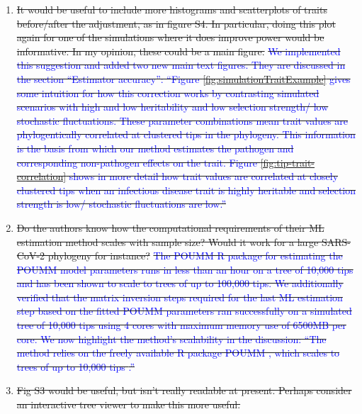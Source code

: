 \documentclass[12pt]{article} %
\providecommand{\DIFdel}[1]{{\protect\color{red}\sout{#1}}}                      %
\begin{document}
\begin{enumerate}
\item%
\DIFdel{It would be useful to include more histograms and scatterplots of traits before/after the adjustment, as in figure S4. In particular, doing this plot again for one of the simulations where it does improve power would be informative. In my opinion, these could be a main figure. }%
\DIFdel{\textcolor{blue}{We implemented this suggestion and added two new main text figures. They are discussed in the section ``Estimator accuracy'': ``Figure \ref{fig:simulationTraitExample} gives some intuition for how this correction works by contrasting simulated scenarios with high and low heritability and low selection strength/ low stochastic fluctuations. These parameter combinations mean trait values are phylogentically correlated at clustered tips in the phylogeny. This information is the basis from which our method estimates the pathogen and corresponding non-pathogen effects on the trait. Figure \ref{fig:tip-trait-correlation} shows in more detail how trait values are correlated at closely clustered tips when an infectious disease trait is highly heritable and selection strength is low/ stochastic fluctuations are low.''}
    }%
\item%
\DIFdel{Do the authors know how the computational requirements of their ML estimation method scales with sample size? Would it work for a large SARS-CoV-2 phylogeny for instance? }%
\DIFdel{\textcolor{blue}{The POUMM R package for estimating the POUMM model parameters runs in less than an hour on a tree of 10,000 tips and has been shown to scale to trees of up to 100,000 tips. We additionally verified that the matrix inversion steps required for the last ML estimation step based on the fitted POUMM parameters ran successfully on a simulated tree of 10,000 tips using 4 cores with maximum memory use of 6500MB per core. We now highlight the method's scalability in the discussion: ``The method relies on the freely available R package POUMM \citep{Mitov2017a-POUMM}, which scales to trees of up to 10,000 tips \citep{Mitov2019}.''}
    }%
\item%
\DIFdel{Fig S3 would be useful, but isn't really readable at present. Perhaps consider an interactive tree viewer to make this more useful. }%

\end{enumerate}
\end{document}
